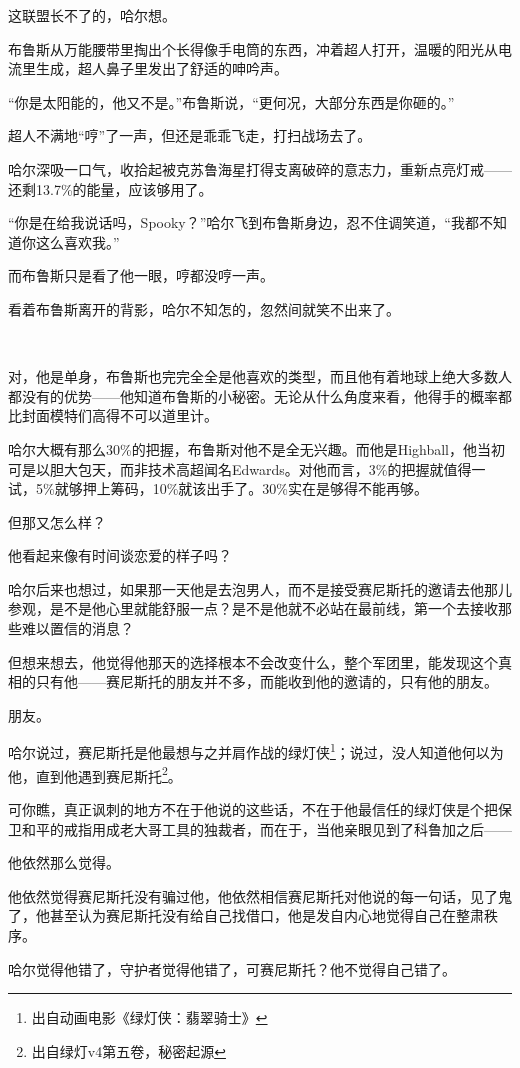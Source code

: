 \documentclass[../main]{subfiles}
\begin{document}
这联盟长不了的，哈尔想。

布鲁斯从万能腰带里掏出个长得像手电筒的东西，冲着超人打开，温暖的阳光从电流里生成，超人鼻子里发出了舒适的呻吟声。

“你是太阳能的，他又不是。”布鲁斯说，“更何况，大部分东西是你砸的。”

超人不满地“哼”了一声，但还是乖乖飞走，打扫战场去了。

哈尔深吸一口气，收拾起被克苏鲁海星打得支离破碎的意志力，重新点亮灯戒——还剩13.7\%的能量，应该够用了。

“你是在给我说话吗，Spooky？”哈尔飞到布鲁斯身边，忍不住调笑道，“我都不知道你这么喜欢我。”

而布鲁斯只是看了他一眼，哼都没哼一声。

看着布鲁斯离开的背影，哈尔不知怎的，忽然间就笑不出来了。

~\

对，他是单身，布鲁斯也完完全全是他喜欢的类型，而且他有着地球上绝大多数人都没有的优势——他知道布鲁斯的小秘密。无论从什么角度来看，他得手的概率都比封面模特们高得不可以道里计。

哈尔大概有那么30\%的把握，布鲁斯对他不是全无兴趣。而他是Highball，他当初可是以胆大包天，而非技术高超闻名Edwards。对他而言，3\%的把握就值得一试，5\%就够押上筹码，10\%就该出手了。30\%实在是够得不能再够。

但那又怎么样？

他看起来像有时间谈恋爱的样子吗？

哈尔后来也想过，如果那一天他是去泡男人，而不是接受赛尼斯托的邀请去他那儿参观，是不是他心里就能舒服一点？是不是他就不必站在最前线，第一个去接收那些难以置信的消息？

但想来想去，他觉得他那天的选择根本不会改变什么，整个军团里，能发现这个真相的只有他——赛尼斯托的朋友并不多，而能收到他的邀请的，只有他的朋友。

朋友。

哈尔说过，赛尼斯托是他最想与之并肩作战的绿灯侠\footnote[1]{出自动画电影《绿灯侠：翡翠骑士》}；说过，没人知道他何以为他，直到他遇到赛尼斯托\footnote[2]{出自绿灯v4第五卷，秘密起源}。

可你瞧，真正讽刺的地方不在于他说的这些话，不在于他最信任的绿灯侠是个把保卫和平的戒指用成老大哥工具的独裁者，而在于，当他亲眼见到了科鲁加之后——

他依然那么觉得。

他依然觉得赛尼斯托没有骗过他，他依然相信赛尼斯托对他说的每一句话，见了鬼了，他甚至认为赛尼斯托没有给自己找借口，他是发自内心地觉得自己在整肃秩序。

哈尔觉得他错了，守护者觉得他错了，可赛尼斯托？他不觉得自己错了。
\end{document}
